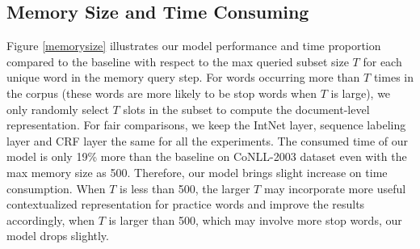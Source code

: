 \documentclass[letterpaper]{article} \usepackage{aaai20}  \usepackage{times}  \usepackage{helvet} \usepackage{courier}  \usepackage[hyphens]{url}  \usepackage{graphicx} \urlstyle{rm} \def\UrlFont{\rm}  \usepackage{graphicx}  \frenchspacing  \setlength{\pdfpagewidth}{8.5in}  \setlength{\pdfpageheight}{11in}
\begin{document}
\begin{table}[t!] 
\centering
{}
\caption{Detailed results on the CoNLL-2003 dataset for IV, OOTV, OOEV, OOBV. }
\label{detail}
\end{table}

\subsection{Memory Size and Time Consuming} 
 Figure \ref{memorysize} illustrates our model performance and time proportion compared to the baseline with respect to the max queried subset size $T$ for each unique word in the memory query step. For words occurring more than $T$ times in the corpus (these words are more likely to be stop words when $T$ is large), we only randomly select $T$ slots in the subset to compute the  document-level representation.
For fair comparisons, we keep the IntNet layer, sequence labeling layer and CRF layer the same for all the experiments. The consumed time of our model is only 19\% more than the baseline  on CoNLL-2003 dataset even with the max memory size as 500.
Therefore, our model  brings slight increase on time consumption. 
When $T$ is less than 500, the larger $T$ may incorporate more useful contextualized representation for practice words and improve the results accordingly, when $T$ is larger than 500, which may involve more stop words, our model drops slightly.
\end{document}
